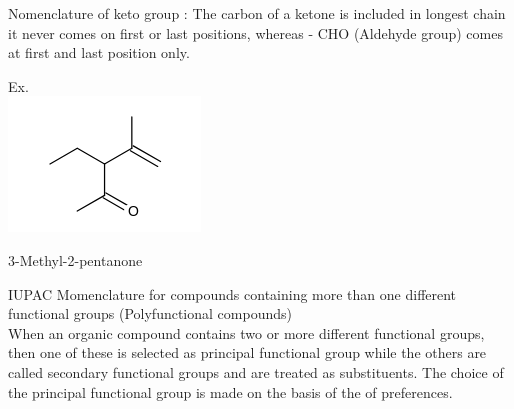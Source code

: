 \documentclass[10pt]{article}
\begin{document}
Nomenclature of keto group : The carbon of a ketone is included in longest chain it never comes on first or last positions, whereas - CHO (Aldehyde group) comes at first and last position only.

Ex.\\
\includegraphics{smile-e946dc82b8a01ff938e96f55e9d4e2606ef33bf4}

3-Methyl-2-pentanone

IUPAC Momenclature for compounds containing more than one different functional groups (Polyfunctional compounds)\\
When an organic compound contains two or more different functional groups, then one of these is selected as principal functional group while the others are called secondary functional groups and are treated as substituents. The choice of the principal functional group is made on the basis of the of preferences.
\end{document}
